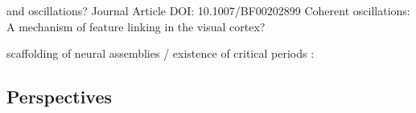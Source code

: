\documentclass[brainsci, %
               review,submit,pdftex,moreauthors%
               ]{Definitions/mdpi}
\begin{document}
and oscillations? Journal Article DOI: 10.1007/BF00202899 Coherent oscillations: A mechanism of feature linking in the visual cortex?

scaffolding of neural assemblies / existence of critical periods :~\citep{dard_rapid_2021}


\subsection{Perspectives}


%
%
%
\end{document}
